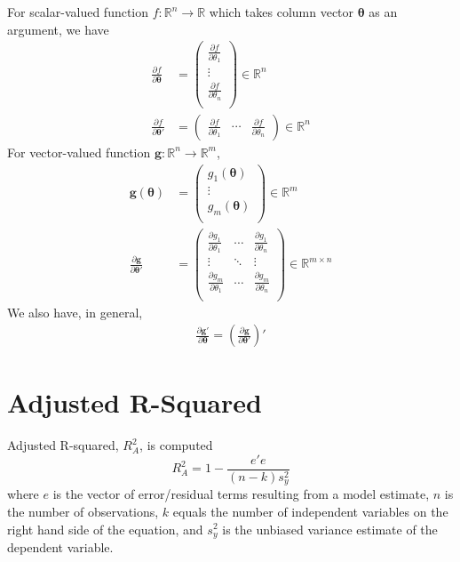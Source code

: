\documentclass[12pt]{article}
\theoremstyle{plain}
\theoremstyle{definition}
\theoremstyle{remark}
\begin{document}
For scalar-valued function $f: \mathbb{R}^n \rightarrow \mathbb{R}$
which takes column vector $\boldsymbol{\theta}$ as an argument, we have
\begin{align*}
  \frac{\partial f}{\partial \boldsymbol{\theta}}
  &=
  \begin{pmatrix}
    \frac{\partial f}{\partial \theta_1} \\
    \vdots\\
    \frac{\partial f}{\partial \theta_n} \\
    \end{pmatrix} \in \mathbb{R}^n\\
  \frac{\partial f}{\partial \boldsymbol{\theta}'}
  &=
  \begin{pmatrix}
    \frac{\partial f}{\partial \theta_1} &
    \cdots&
    \frac{\partial f}{\partial \theta_n}
  \end{pmatrix}\in \mathbb{R}^n
\end{align*}
For vector-valued function $\boldsymbol{g}:
\mathbb{R}^n\rightarrow\mathbb{R}^m$,
\begin{align*}
  \boldsymbol{g}(\boldsymbol{\theta})
  &=
  \begin{pmatrix}
    g_1(\boldsymbol{\theta}) \\
    \vdots \\
    g_m(\boldsymbol{\theta}) \\
  \end{pmatrix}\in \mathbb{R}^m\\
  \frac{\partial \boldsymbol{g}}{\partial \boldsymbol{\theta'}}
  &=
  \begin{pmatrix}
    \frac{\partial g_1}{\partial \theta_1}
      & \cdots & \frac{\partial g_1}{\partial \theta_n}\\
    \vdots & \ddots & \vdots\\
    \frac{\partial g_m}{\partial \theta_1}
      & \cdots & \frac{\partial g_m}{\partial \theta_n}\\
  \end{pmatrix}
  \in \mathbb{R}^{m\times n}
\end{align*}
We also have, in general,
\begin{align*}
  \frac{\partial\boldsymbol{g'}}{\partial \boldsymbol{\theta}}
  =
  \left(
  \frac{\partial\boldsymbol{g}}{\partial \boldsymbol{\theta'}}
  \right)'
\end{align*}

\section{Adjusted R-Squared}

Adjusted R-squared, $R^2_A$, is computed
\[ R^2_A = 1 - \frac{e'e }{(n-k) s_y^2} \]
where $e$ is the vector of error/residual terms resulting from a
model estimate,
$n$ is the number of observations, $k$ equals the number of
independent variables on the right hand side of the equation, and
$s_y^2$ is the unbiased variance estimate of the dependent variable.
\end{document}
